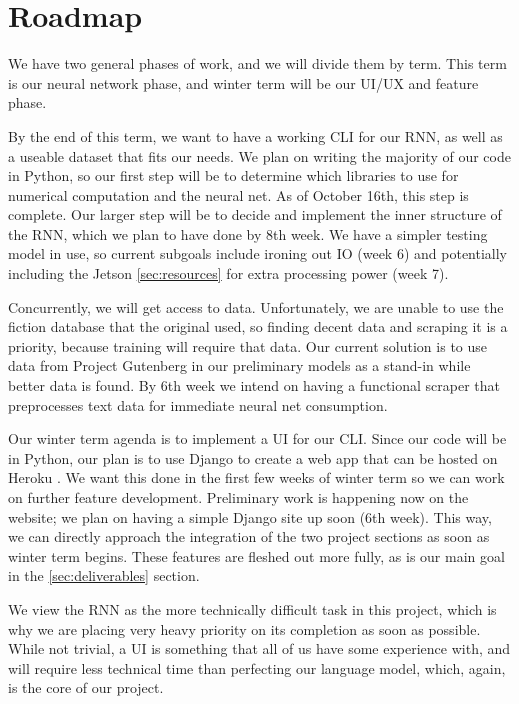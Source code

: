 \section{Roadmap}\label{sec:roadmap}
We have two general phases of work, and we will divide them by term. This term is our neural network phase, and winter term will be our UI/UX and feature phase. 

By the end of this term, we want to have a working CLI for our RNN, as well as a
useable dataset that fits our needs. We plan on writing the majority of our code
in Python, so our first step will be to determine which libraries to use for numerical
computation and the neural net. As of October 16th, this step is complete.
Our larger step will be to decide and implement the inner structure of the RNN,
which we plan to have done by 8th week. We have a simpler testing model in use,
so current subgoals include ironing out IO (week 6) and potentially including the
Jetson \ref{sec:resources} for extra processing power (week 7).

Concurrently, we will get access to data. Unfortunately, we are unable to use the
fiction database that the original used\cite{clark}, so finding decent data and
scraping it is a priority, because training will require that data. Our current
solution is to use data from Project Gutenberg in our preliminary models as a stand-in
while better data is found. By 6th week we intend on having a functional scraper
that preprocesses text data for immediate neural net consumption.

Our winter term agenda is to implement a UI for our CLI. Since our code will be
in Python, our plan is to use Django to create a web app that can be hosted on
Heroku . We want this done in the first few weeks of winter term so we can work
on further feature development. Preliminary work is happening now on the website;
we plan on having a simple Django site up soon (6th week). This way, we can directly
approach the integration of the two project sections as soon as winter term begins.
These features are fleshed out more fully, as is our main goal in the \ref{sec:deliverables} section.

We view the RNN as the more technically difficult task in this project,
which is why we are placing very heavy priority on its completion as soon as
possible. While not trivial, a UI is something that all of us have some
experience with, and will require less technical time than perfecting our
language model, which, again, is the core of our project.
